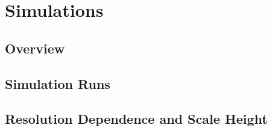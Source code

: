 \chapter{Simulations}\label{sec:simulations}

\section{Overview}


\section{Simulation Runs}

\clearpage


\section{Resolution Dependence and Scale Height}

